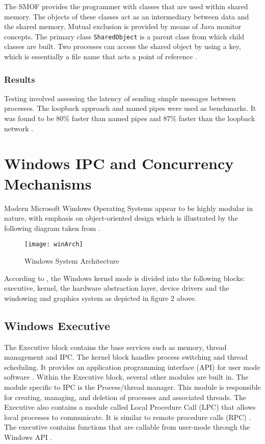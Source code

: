 \documentclass[12pt,a4paper,oneside]{article}
\def\code#1{\texttt{#1}}
\begin{document}
    The SMOF provides the programmer with classes that are used within shared memory. The objects of these classes act as an intermediary between data and the shared memory. Mutual exclusion is provided by means of Java monitor concepts. The primary class \code{SharedObject} is a parent class from which child classes are built. Two processes can access the shared object by using a key, which is essentially a file name that acts a point of reference \citep{WellsEfficientIPCJava}.

    \subsubsection{Results}
      Testing involved assessing the latency of sending simple messages between processes. The loopback approach and named pipes were used as benchmarks. It was found to be 80\% faster than named pipes and 87\% faster than the loopback network \citep{WellsEfficientIPCJava}.

\section{Windows IPC and Concurrency Mechanisms}
  Modern Microsoft Windows Operating Systems appear to be highly modular in nature, with emphasis on object-oriented design which is illustrated by the following diagram taken from \cite{WinInt2009}.
  \begin{figure}[H]
  \texttt{[image: winArch]}
  \label{fig:winArch}
  \caption{Windows System Architecture}
  \end{figure}
  According to \cite{OSInternals&DesignPrinciplesStallings}, the Windows kernel mode is divided into the following blocks: executive, kernel, the hardware abstraction layer, device drivers and the windowing and graphics system as depicted in figure 2 above.

  \subsection{Windows Executive}
    The Executive block contains the base services such as memory, thread management and IPC. The kernel block handles process switching and thread scheduling.
    It provides an application programming interface (API) for user mode software \citep{OSInternals&DesignPrinciplesStallings}. Within the Executive block, several other modules are built in. The module specific to IPC is the Process/thread manager. This module is responsible for creating, managing, and deletion of processes and associated threads. The Executive also contains a module called Local Procedure Call (LPC) that allows local processes to communicate. It is similar to remote procedure calls (RPC) \citep{OSInternals&DesignPrinciplesStallings}. The executive contains functions that are callable from user-mode through the Windows API \citep{WinInternalsPart12012}.
\end{document}
